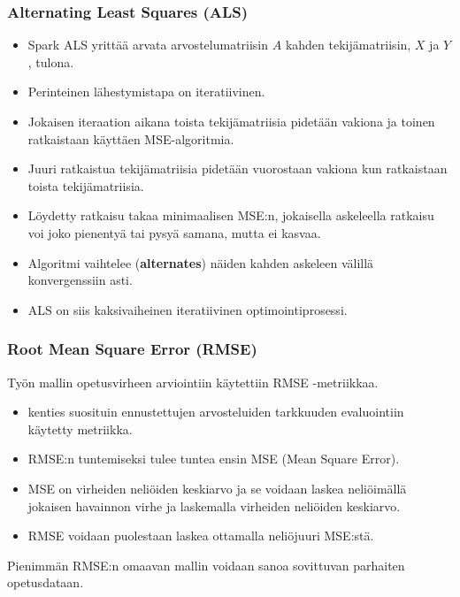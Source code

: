 \documentclass{beamer}
\begin{document}
\begin{frame}
\frametitle{Alternating Least Squares (ALS)}

\begin{itemize}
	\item Spark ALS yrittää arvata arvostelumatriisin $A$ kahden tekijämatriisin, $X$ ja $Y$, tulona.
	\item Perinteinen lähestymistapa on iteratiivinen.
	\item Jokaisen iteraation aikana toista tekijämatriisia pidetään vakiona ja toinen ratkaistaan käyttäen MSE-algoritmia.
	\item Juuri ratkaistua tekijämatriisia pidetään vuorostaan vakiona kun ratkaistaan toista tekijämatriisia.
	\item Löydetty ratkaisu takaa minimaalisen MSE:n, jokaisella askeleella ratkaisu voi joko pienentyä tai pysyä samana, mutta ei kasvaa.
	\item Algoritmi vaihtelee (\textbf{alternates}) näiden kahden askeleen välillä konvergenssiin asti.
	\item ALS on siis kaksivaiheinen iteratiivinen optimointiprosessi.
\end{itemize}

\end{frame}


\begin{frame}
\frametitle{Root Mean Square Error (RMSE)}

Työn mallin opetusvirheen arviointiin käytettiin RMSE -metriikkaa.

\begin{itemize}
	\item kenties suosituin ennustettujen arvosteluiden tarkkuuden evaluointiin käytetty metriikka.
	\item RMSE:n tuntemiseksi tulee tuntea ensin MSE (Mean Square Error).
	\item MSE on virheiden neliöiden keskiarvo ja se voidaan laskea neliöimällä jokaisen havainnon virhe ja laskemalla virheiden neliöiden keskiarvo.
	\item RMSE voidaan puolestaan laskea ottamalla neliöjuuri MSE:stä.
\end{itemize}

Pienimmän RMSE:n omaavan mallin voidaan sanoa sovittuvan parhaiten opetusdataan.

\end{frame}

\end{document}

